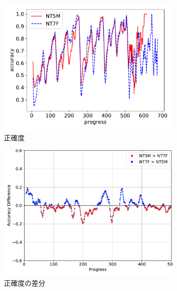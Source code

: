 \begin{figure}[t]
\centering
\begin{subfigure}[b]{0.49\linewidth}
    \includegraphics[width=\linewidth]{pdf/compare/EXP6_NT5M_and_NT7F/accuracy.pdf}
    \caption{正確度}
    \label{fig:EXP6_NT5M_and_NT7F_accuracy}
\end{subfigure}
\begin{subfigure}[b]{0.49\linewidth}
    \includegraphics[width=\linewidth]{pdf/compare/EXP6_NT5M_and_NT7F/acc_diff_plot.pdf}
    \caption{正確度の差分}
    \label{fig:EXP6_NT5M_and_NT7F_acc_diff}
\end{subfigure}
\begin{subfigure}[b]{0.49\linewidth}

\end{subfigure}
\end{figure}

